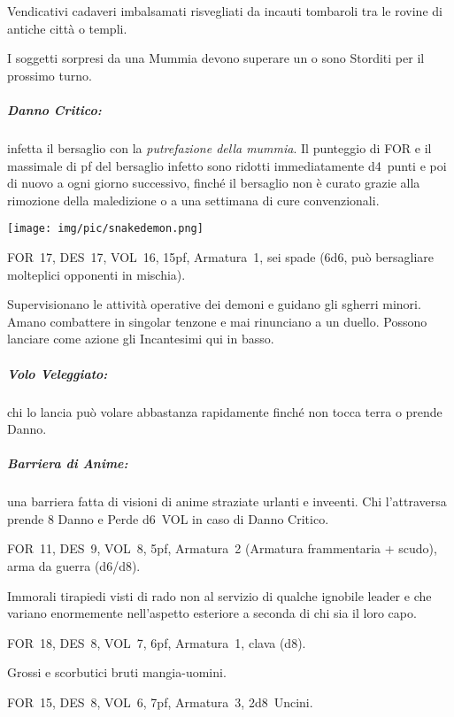 \documentclass[itdr]{subfiles}
\begin{document}
Vendicativi cadaveri imbalsamati risvegliati da incauti tombaroli tra le rovine di antiche città o templi.

I soggetti sorpresi da una Mummia devono superare un  o sono Storditi per il prossimo turno.

\subparagraph{Danno Critico:} infetta il bersaglio con la {\em putrefazione della mummia}. Il punteggio di FOR e il massimale di pf del bersaglio infetto sono ridotti immediatamente d4~punti e poi di nuovo a ogni giorno successivo, finché il bersaglio non è curato grazie alla rimozione della maledizione o a una settimana di cure convenzionali.

\break

\begin{center}
\texttt{[image: img/pic/snakedemon.png]}
\end{center}

\vspace{-2ex}

FOR~17, DES~17, VOL~16, 15pf, Armatura~1, sei spade (6d6, può bersagliare molteplici opponenti in mischia).

Supervisionano le attività operative dei demoni e guidano gli sgherri minori. Amano combattere in singolar tenzone e mai rinunciano a un duello. Possono lanciare come azione gli Incantesimi qui in basso.

\subparagraph{Volo Veleggiato:} chi lo lancia può volare abbastanza rapidamente finché non tocca terra o prende Danno.

\subparagraph{Barriera di Anime:} una barriera fatta di visioni di anime straziate urlanti e inveenti. Chi l'attraversa prende 8 Danno e Perde d6~VOL in caso di Danno Critico.

\vfill

FOR~11, DES~9, VOL~8, 5pf, Armatura~2 (Armatura frammentaria + scudo), arma da guerra (d6/d8).

Immorali tirapiedi visti di rado non al servizio di qualche ignobile leader e che variano enormemente nell'aspetto esteriore a seconda di chi sia il loro capo.

\vfill

FOR~18, DES~8, VOL~7, 6pf, Armatura~1, clava (d8).

Grossi e scorbutici bruti mangia-uomini.

\vfill

FOR~15, DES~8, VOL~6, 7pf, Armatura~3, 2d8~Uncini.
\end{document}
